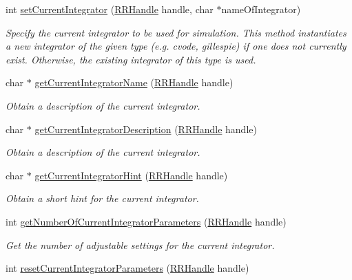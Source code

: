 \begin{DoxyCompactItemize}
int \hyperlink{group__simopts_ga7d4664a6a66a2a9b224db95b751127fe}{set\+Current\+Integrator} (\hyperlink{rrc__types_8h_a1d68f0592372208fa5a5f2799ea4b3ae}{R\+R\+Handle} handle, char $\ast$name\+Of\+Integrator)
\begin{DoxyCompactList}\small\item\em Specify the current integrator to be used for simulation.  This method instantiates a new integrator of the given type (e.\+g. cvode, gillespie) if one does not currently exist. Otherwise, the existing integrator of this type is used. \end{DoxyCompactList}\item 
char $\ast$ \hyperlink{group__simopts_gac5b7c83a8b539302b657f4ad3522fc9c}{get\+Current\+Integrator\+Name} (\hyperlink{rrc__types_8h_a1d68f0592372208fa5a5f2799ea4b3ae}{R\+R\+Handle} handle)
\begin{DoxyCompactList}\small\item\em Obtain a description of the current integrator. \end{DoxyCompactList}\item 
char $\ast$ \hyperlink{group__simopts_ga4a917a0539977b7206d1bfbddcc98347}{get\+Current\+Integrator\+Description} (\hyperlink{rrc__types_8h_a1d68f0592372208fa5a5f2799ea4b3ae}{R\+R\+Handle} handle)
\begin{DoxyCompactList}\small\item\em Obtain a description of the current integrator. \end{DoxyCompactList}\item 
char $\ast$ \hyperlink{group__simopts_gadc3f18f7a683daa8848968ba54436f96}{get\+Current\+Integrator\+Hint} (\hyperlink{rrc__types_8h_a1d68f0592372208fa5a5f2799ea4b3ae}{R\+R\+Handle} handle)
\begin{DoxyCompactList}\small\item\em Obtain a short hint for the current integrator. \end{DoxyCompactList}\item 
int \hyperlink{group__simopts_ga7885d06904fc2cdceaa7e71448cde468}{get\+Number\+Of\+Current\+Integrator\+Parameters} (\hyperlink{rrc__types_8h_a1d68f0592372208fa5a5f2799ea4b3ae}{R\+R\+Handle} handle)
\begin{DoxyCompactList}\small\item\em Get the number of adjustable settings for the current integrator. \end{DoxyCompactList}\item 
int \hyperlink{group__simopts_gaefa42b6e122d13988bde99fcf6e050d6}{reset\+Current\+Integrator\+Parameters} (\hyperlink{rrc__types_8h_a1d68f0592372208fa5a5f2799ea4b3ae}{R\+R\+Handle} handle)

\end{DoxyCompactItemize}
